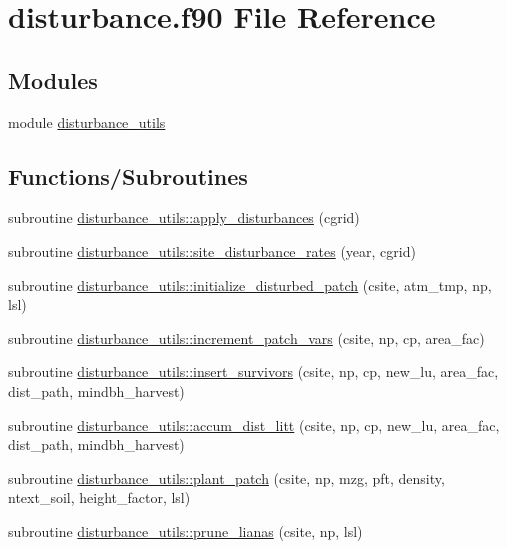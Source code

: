 \hypertarget{disturbance_8f90}{}\section{disturbance.\+f90 File Reference}
\label{disturbance_8f90}
\subsection*{Modules}
\begin{DoxyCompactItemize}
\item 
module \hyperlink{namespacedisturbance__utils}{disturbance\+\_\+utils}
\end{DoxyCompactItemize}
\subsection*{Functions/\+Subroutines}
\begin{DoxyCompactItemize}
\item 
subroutine \hyperlink{namespacedisturbance__utils_a29d6db4e94463404643e5c3666c67767}{disturbance\+\_\+utils\+::apply\+\_\+disturbances} (cgrid)
\item 
subroutine \hyperlink{namespacedisturbance__utils_a9045765ed99ce8acf000838b2c532deb}{disturbance\+\_\+utils\+::site\+\_\+disturbance\+\_\+rates} (year, cgrid)
\item 
subroutine \hyperlink{namespacedisturbance__utils_a31b6105dc67086438d6827bbffaf4bc4}{disturbance\+\_\+utils\+::initialize\+\_\+disturbed\+\_\+patch} (csite, atm\+\_\+tmp, np, lsl)
\item 
subroutine \hyperlink{namespacedisturbance__utils_a60d031d31fcde31370f73cebaaaadb24}{disturbance\+\_\+utils\+::increment\+\_\+patch\+\_\+vars} (csite, np, cp, area\+\_\+fac)
\item 
subroutine \hyperlink{namespacedisturbance__utils_ac25d6a408136dff3bccca56269ca858f}{disturbance\+\_\+utils\+::insert\+\_\+survivors} (csite, np, cp, new\+\_\+lu, area\+\_\+fac, dist\+\_\+path, mindbh\+\_\+harvest)
\item 
subroutine \hyperlink{namespacedisturbance__utils_a5e78ef6d3bd2f31c0abfaf8e86045187}{disturbance\+\_\+utils\+::accum\+\_\+dist\+\_\+litt} (csite, np, cp, new\+\_\+lu, area\+\_\+fac, dist\+\_\+path, mindbh\+\_\+harvest)
\item 
subroutine \hyperlink{namespacedisturbance__utils_ac78f23ae05ca7cd196ebeeda52e66507}{disturbance\+\_\+utils\+::plant\+\_\+patch} (csite, np, mzg, pft, density, ntext\+\_\+soil, height\+\_\+factor, lsl)
\item 
subroutine \hyperlink{namespacedisturbance__utils_adea8e04f93328f6e7137a5c490d0615a}{disturbance\+\_\+utils\+::prune\+\_\+lianas} (csite, np, lsl)
\end{DoxyCompactItemize}
